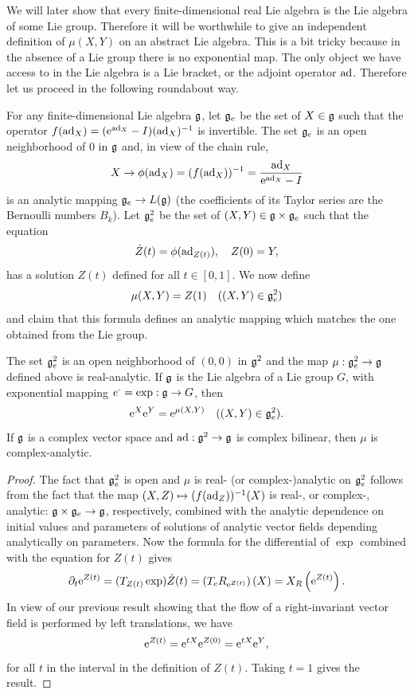 We will later show that every finite-dimensional real Lie algebra is the Lie algebra of some Lie group. Therefore it will be worthwhile to give an independent definition of $\mu(X,Y)$ on an abstract Lie algebra. This is a bit tricky because in the absence of a Lie group there is no exponential map. The only object we have access to in the Lie algebra is a Lie bracket, or the adjoint operator $\mathrm{ad}$. Therefore let us proceed in the following roundabout way.

For any finite-dimensional Lie algebra $\mathfrak{g}$, let $\mathfrak{g}_e$ be the set of $X\in \mathfrak{g}$ such that the operator $f(\mathrm{ad}_X)=(\mathrm{e}^{\mathrm{ad}_X}-I)(\mathrm{ad}_X)^{-1}$ is invertible. The set $\mathfrak{g}_e$ is an open neighborhood of $0$ in $\mathfrak{g}$ and, in view of the chain rule,
\[X\to \phi(\mathrm{ad}_X)=(f(\mathrm{ad}_X))^{-1}=\frac{\mathrm{ad}_X}{\mathrm{e}^{\mathrm{ad}_X}-I}\]
is an analytic mapping $\mathfrak{g}_e\to \boldsymbol{\mathrm{\mathrm}}{L}(\mathfrak{g})$ (the coefficients of its Taylor series are the Bernoulli numbers $B_k$). Let $\mathfrak{g}_e^2$ be the set of $(X,Y)\in \mathfrak{g}\times\mathfrak{g}_e$ such that the equation
\[\dot Z(t)=\phi(\mathrm{ad}_{Z(t)}),\quad Z(0)=Y,\label{eq Z(t)}\]
has a solution $Z(t)$ defined for all $t\in [0,1]$. We now define
\[\mu(X,Y)=Z(1)\quad ((X,Y)\in\mathfrak{g}_e^2) \label{def local mu}\]
and claim that this formula defines an analytic mapping which matches the one obtained from the Lie group.


\begin{thm}[{{\cite[Thm.~1.6.1]{DK}}}]
    The set $\mathfrak{g}_e^2$ is an open neighborhood of $(0,0)$ in $\mathfrak{g}^2$ and the map $\mu:\mathfrak{g}_e^2\to \mathfrak{g}$ defined above is real-analytic. If $\mathfrak{g}$ is the Lie algebra of a Lie group $G$, with exponential mapping $e^\cdot=\exp:\mathfrak{g}\to G$, then
    \[\mathrm{e}^X \mathrm{e}^Y=\mathrm{e}^{\mu(X,Y)}\quad ((X,Y)\in\mathfrak{g}_e^2).\]
    If $\mathfrak{g}$ is a complex vector space and $\mathrm{ad}:\mathfrak{g}^2\to \mathfrak{g}$ is complex bilinear, then $\mu$ is complex-analytic.
\end{thm}
\begin{proof}
    The fact that $\mathfrak{g}_e^2$ is open and $\mu$ is real- (or complex-)analytic on $\mathfrak{g}_e^2$ follows from the fact that the map $(X,Z)\mapsto (f(\mathrm{ad}_Z))^{-1}(X)$ is real-, or complex-, analytic: $\mathfrak{g}\times\mathfrak{g}_e\to \mathfrak{g}$, respectively, combined with the analytic dependence on initial values and parameters of solutions of analytic vector fields depending analytically on parameters. Now the formula for the differential of $\exp$ combined with the equation for $Z(t)$ gives
    \[\partial_t \mathrm{e}^{Z(t)}=(T_{Z(t)}\exp )\dot Z(t)=\left(T_e R_{\mathrm{e}^{Z(t)}}\right)(X)=X_R\left(\mathrm{e}^{Z(t)}\right).\]
    In view of our previous result showing that the flow of a right-invariant vector field is performed by left translations, we have
    \[\mathrm{e}^{Z(t)}=\mathrm{e}^{tX}\mathrm{e}^{Z(0)}=\mathrm{e}^{tX}\mathrm{e}^Y,\label{8284}\]
    for all $t$ in the interval in the definition of $Z(t)$. Taking $t=1$ gives the result.
\end{proof}

